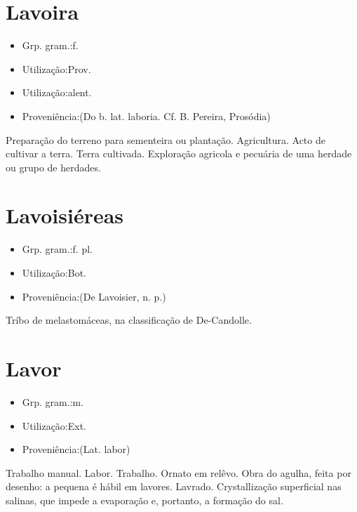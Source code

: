 \section{Lavoira}
\begin{itemize}
\item {Grp. gram.:f.}
\end{itemize}
\begin{itemize}
\item {Utilização:Prov.}
\end{itemize}
\begin{itemize}
\item {Utilização:alent.}
\end{itemize}
\begin{itemize}
\item {Proveniência:(Do b. lat. \textunderscore laboria\textunderscore . Cf. B. Pereira, \textunderscore Prosódia\textunderscore )}
\end{itemize}
Preparação do terreno para sementeira ou plantação.
Agricultura.
Acto de cultivar a terra.
Terra cultivada.
Exploração agricola e pecuária de uma herdade ou grupo de herdades.
\section{Lavoisiéreas}
\begin{itemize}
\item {Grp. gram.:f. pl.}
\end{itemize}
\begin{itemize}
\item {Utilização:Bot.}
\end{itemize}
\begin{itemize}
\item {Proveniência:(De \textunderscore Lavoisier\textunderscore , n. p.)}
\end{itemize}
Tríbo de melastomáceas, na classificação de De-Candolle.
\section{Lavor}
\begin{itemize}
\item {Grp. gram.:m.}
\end{itemize}
\begin{itemize}
\item {Utilização:Ext.}
\end{itemize}
\begin{itemize}
\item {Proveniência:(Lat. \textunderscore labor\textunderscore )}
\end{itemize}
Trabalho manual.
Labor.
Trabalho.
Ornato em relêvo.
Obra do agulha, feita por desenho: \textunderscore a pequena é hábil em lavores\textunderscore .
Lavrado.
Crystallização superficial nas salinas, que impede a evaporação e, portanto, a formação do sal.
